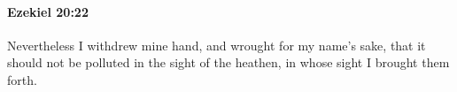 
		\paragraph{Ezekiel 20:22} %
			\label{EZEKIEL-20-22}

			Nevertheless I withdrew mine hand, and wrought for my name’s sake, that it should not be polluted in the sight of the heathen, in whose sight I brought them forth.


